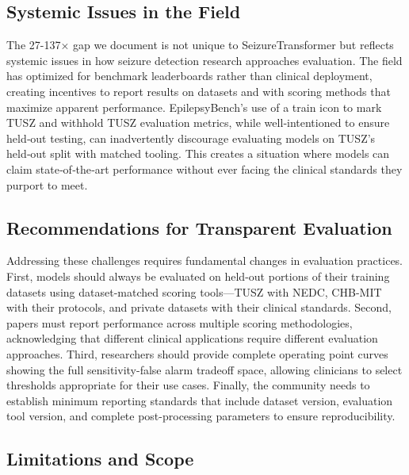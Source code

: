 \documentclass[
  10pt,
]{article}
\begin{document}
\hypertarget{systemic-issues-in-the-field}{%
\subsection{Systemic Issues in the
Field}\label{systemic-issues-in-the-field}}

The 27-137× gap we document is not unique to SeizureTransformer but
reflects systemic issues in how seizure detection research approaches
evaluation. The field has optimized for benchmark leaderboards rather
than clinical deployment, creating incentives to report results on
datasets and with scoring methods that maximize apparent performance.
EpilepsyBench's use of a train icon to mark TUSZ and withhold TUSZ
evaluation metrics, while well‑intentioned to ensure held‑out testing,
can inadvertently discourage evaluating models on TUSZ's held‑out split
with matched tooling. This creates a situation where models can claim
state‑of‑the‑art performance without ever facing the clinical standards
they purport to meet.

\hypertarget{recommendations-for-transparent-evaluation}{%
\subsection{Recommendations for Transparent
Evaluation}\label{recommendations-for-transparent-evaluation}}

Addressing these challenges requires fundamental changes in evaluation
practices. First, models should always be evaluated on held-out portions
of their training datasets using dataset-matched scoring tools---TUSZ
with NEDC, CHB-MIT with their protocols, and private datasets with their
clinical standards. Second, papers must report performance across
multiple scoring methodologies, acknowledging that different clinical
applications require different evaluation approaches. Third, researchers
should provide complete operating point curves showing the full
sensitivity-false alarm tradeoff space, allowing clinicians to select
thresholds appropriate for their use cases. Finally, the community needs
to establish minimum reporting standards that include dataset version,
evaluation tool version, and complete post-processing parameters to
ensure reproducibility.

\hypertarget{limitations-and-scope}{%
\subsection{Limitations and Scope}\label{limitations-and-scope}}
\end{document}
